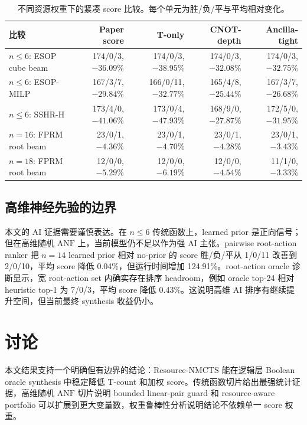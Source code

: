 \documentclass[UTF8,fontset=macnew,11pt]{ctexart}
\newcommand{\method}{Resource-NMCTS}
\newcommand{\anf}{\ensuremath{\mathrm{ANF}}}
\begin{document}
\begin{table}[t]
\centering
\small
\caption{不同资源权重下的紧凑 score 比较。每个单元为胜/负/平与平均相对变化。}
\label{tab:weight}
\begin{tabularx}{\linewidth}{>{\raggedright\arraybackslash}Xrrrr}
\toprule
比较 & Paper score & T-only & CNOT-depth & Ancilla-tight \\
\midrule
$n\leq6$: ESOP cube beam & 174/0/3, $-36.09\%$ & 174/0/3, $-38.95\%$ & 174/0/3, $-32.08\%$ & 174/0/3, $-32.75\%$ \\
$n\leq6$: ESOP-MILP & 167/3/7, $-29.84\%$ & 166/0/11, $-32.77\%$ & 165/4/8, $-25.44\%$ & 167/3/7, $-26.68\%$ \\
$n\leq6$: SSHR-H & 173/4/0, $-41.06\%$ & 173/0/4, $-47.93\%$ & 168/9/0, $-27.87\%$ & 172/5/0, $-31.95\%$ \\
$n=16$: FPRM root beam & 23/0/1, $-4.36\%$ & 23/0/1, $-4.70\%$ & 23/0/1, $-4.28\%$ & 23/0/1, $-3.43\%$ \\
$n=18$: FPRM root beam & 12/0/0, $-5.29\%$ & 12/0/0, $-6.19\%$ & 12/0/0, $-4.54\%$ & 11/1/0, $-3.33\%$ \\
\bottomrule
\end{tabularx}
\end{table}

\subsection{高维神经先验的边界}

本文的 AI 证据需要谨慎表达。在 $n\leq6$ 传统函数上，learned prior 是正向信号；但在高维随机 \anf{} 上，当前模型仍不足以作为强 AI 主张。pairwise root-action ranker 把 $n=14$ learned prior 相对 no-prior 的 score 胜/负/平从 1/0/11 改善到 2/0/10，平均 score 降低 0.04\%，但运行时间增加 124.91\%。root-action oracle 诊断显示，宽 root-action set 内确实存在排序 headroom，例如 oracle top-24 相对 heuristic top-1 为 7/0/3，平均 score 降低 0.43\%。这说明高维 AI 排序有继续提升空间，但当前最终 synthesis 收益仍小。

\section{讨论}

本文结果支持一个明确但有边界的结论：\method{} 能在逻辑层 Boolean oracle synthesis 中稳定降低 T-count 和加权 score。传统函数切片给出最强统计证据，高维随机 \anf{} 切片说明 bounded linear-pair guard 和 resource-aware portfolio 可以扩展到更大变量数，权重鲁棒性分析说明结论不依赖单一 score 权重。
\end{document}
